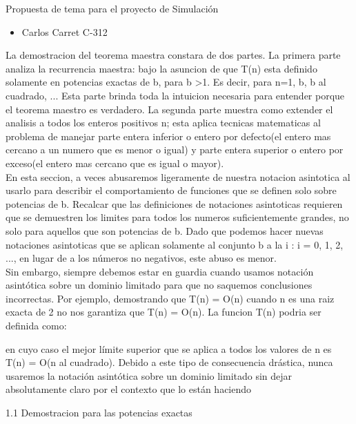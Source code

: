 \documentclass[a4paper, 12pt]{article}
\begin{document}
\begin{center}
\Huge Propuesta de tema para el proyecto de Simulaci\'on
\end{center}

\begin{itemize}
\item Carlos Carret C-312
\end{itemize}

La demostracion del teorema maestra constara de dos partes. La primera parte analiza la recurrencia maestra:
bajo la asuncion de que T(n) esta definido solamente en potencias exactas de b, para b >1. Es decir, para n=1, b, b al cuadrado, ... Esta parte brinda toda la intuicion necesaria para entender porque el teorema maestro es verdadero. La segunda parte muestra como extender el analisis a todos los enteros positivos n; esta aplica tecnicas matematicas al problema de manejar parte entera inferior o entero por defecto(el entero mas cercano a un numero que es menor o igual) y parte entera superior o entero por exceso(el entero mas cercano que es igual o mayor).\\
En esta seccion, a veces abusaremos ligeramente de nuestra notacion asintotica al usarlo para describir el comportamiento de funciones que se definen solo sobre potencias de b. Recalcar que las definiciones de notaciones asintoticas requieren que se demuestren los limites para todos los numeros suficientemente grandes, no solo para aquellos que son potencias de b. Dado que podemos hacer nuevas notaciones asintoticas que se aplican solamente al conjunto {b a la i : i = 0, 1, 2, ...}, en lugar de a los números no negativos, este abuso es menor.\\
Sin embargo, siempre debemos estar en guardia cuando usamos notación asintótica sobre un dominio limitado para que no saquemos conclusiones incorrectas. Por ejemplo, demostrando que T(n) = O(n) cuando n es una raiz exacta de 2 no nos garantiza que T(n) = O(n). La funcion T(n) podria ser definida como:

en cuyo caso el mejor límite superior que se aplica a todos los valores de n es T(n) = O(n al cuadrado). 
Debido a este tipo de consecuencia drástica, nunca usaremos la notación asintótica sobre un dominio limitado sin dejar absolutamente claro por el contexto que lo están haciendo

1.1 Demostracion para las potencias exactas
\end{document}
